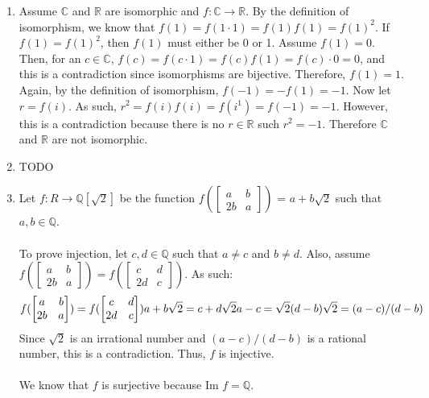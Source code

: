 \documentclass{article}
\begin{document}
\begin{enumerate}
\item Assume $\mathbb{C}$ and $\mathbb{R}$ are isomorphic and
$f: \mathbb{C} \rightarrow \mathbb{R}$.  By the definition of isomorphism,
we know that $f(1) = f(1\cdot1) = f(1)f(1) = f(1)^2$.  If $f(1) = f(1)^2$, then
$f(1)$ must either be 0 or 1.  Assume $f(1) = 0$.  Then, for an $c \in \mathbb{C}$,
$f(c) = f(c\cdot1) = f(c)f(1) = f(c)\cdot0 = 0$, and this is a contradiction since
isomorphisms are bijective.  Therefore, $f(1) = 1$.  Again, by the definition
of isomorphism, $f(-1) = -f(1) = -1$.  Now let $r = f(i)$.  As such,
$r^2 = f(i)f(i) = f(i^1) = f(-1) = -1$.  However, this is a contradiction
because there is no $r \in \mathbb{R}$ such $r^2 = -1$.  Therefore
$\mathbb{C}$ and $\mathbb{R}$ are not isomorphic.

\item TODO

\item Let $f: R \rightarrow \mathbb{Q}[\sqrt{2}]$ be the function
$f(\begin{bmatrix} a & b \\ 2b & a \end{bmatrix})$ = $a + b\sqrt2$ such that
$a, b \in \mathbb{Q}$. \\ \\

To prove injection, let $c, d \in \mathbb{Q}$ such that $a \neq c$ and $b \neq d$.
Also, assume $f(\begin{bmatrix} a & b \\ 2b & a \end{bmatrix}) = f(\begin{bmatrix} c & d \\ 2d & c \end{bmatrix})$.
As such:
\[
f(\begin{bmatrix} a & b \\ 2b & a \end{bmatrix}) = f(\begin{bmatrix} c & d \\ 2d & c \end{bmatrix}) \\
a + b\sqrt2 = c + d\sqrt2
a - c = \sqrt{2}(d - b)
\sqrt2 = (a - c)/(d - b)
\]
Since $\sqrt2$ is an irrational number and $(a-c)/(d-b)$ is a rational number,
this is a contradiction.  Thus, $f$ is injective. \\ \\
We know that $f$ is surjective because Im $f = \mathbb{Q}$. \\ \\


\end{enumerate}
\end{document}
